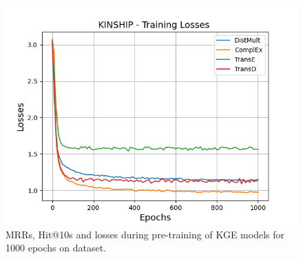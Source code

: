 \begin{figure}
\begin{minipage}{.3\textwidth}
      \includegraphics[width=\linewidth]{figures/results/pretrain/kinship/pretrain_kinship_losses.png}
    \end{minipage}%
    \caption{MRRs, Hit@10s and losses during pre-training of \ac{KGE} models for 1000 epochs on \kinship dataset.}
    \label{fig:pretraining}
\end{figure}
